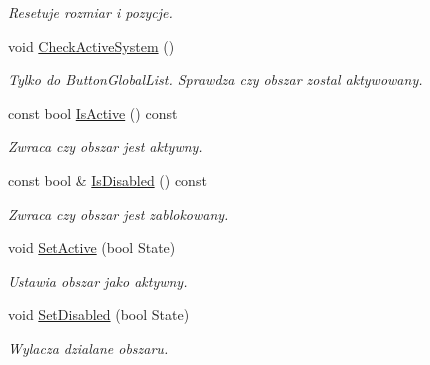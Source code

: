 \begin{DoxyCompactItemize}
\begin{DoxyCompactList}\small\item\em Resetuje rozmiar i pozycje. \end{DoxyCompactList}\item 
\mbox{\label{classtfp_1_1_focus_area_a8845bdc93312122866358dde785c9520}} 
void \mbox{\hyperlink{classtfp_1_1_focus_area_a8845bdc93312122866358dde785c9520}{Check\+Active\+System}} ()
\begin{DoxyCompactList}\small\item\em Tylko do Button\+Global\+List. Sprawdza czy obszar zostal aktywowany. \end{DoxyCompactList}\item 
\mbox{\label{classtfp_1_1_focus_area_a688762f6b1eaaea4adb66db42ea7ec75}} 
const bool \mbox{\hyperlink{classtfp_1_1_focus_area_a688762f6b1eaaea4adb66db42ea7ec75}{Is\+Active}} () const
\begin{DoxyCompactList}\small\item\em Zwraca czy obszar jest aktywny. \end{DoxyCompactList}\item 
\mbox{\label{classtfp_1_1_focus_area_a1f96773c225358d61f052781fa94f119}} 
const bool \& \mbox{\hyperlink{classtfp_1_1_focus_area_a1f96773c225358d61f052781fa94f119}{Is\+Disabled}} () const
\begin{DoxyCompactList}\small\item\em Zwraca czy obszar jest zablokowany. \end{DoxyCompactList}\item 
\mbox{\label{classtfp_1_1_focus_area_aafb2d16bbd9559d94426423220a09881}} 
void \mbox{\hyperlink{classtfp_1_1_focus_area_aafb2d16bbd9559d94426423220a09881}{Set\+Active}} (bool State)
\begin{DoxyCompactList}\small\item\em Ustawia obszar jako aktywny. \end{DoxyCompactList}\item 
\mbox{\label{classtfp_1_1_focus_area_ad16347bcf04432d4b7273d8322245bf9}} 
void \mbox{\hyperlink{classtfp_1_1_focus_area_ad16347bcf04432d4b7273d8322245bf9}{Set\+Disabled}} (bool State)
\begin{DoxyCompactList}\small\item\em Wylacza dzialane obszaru. \end{DoxyCompactList}\item 

\end{DoxyCompactItemize}
